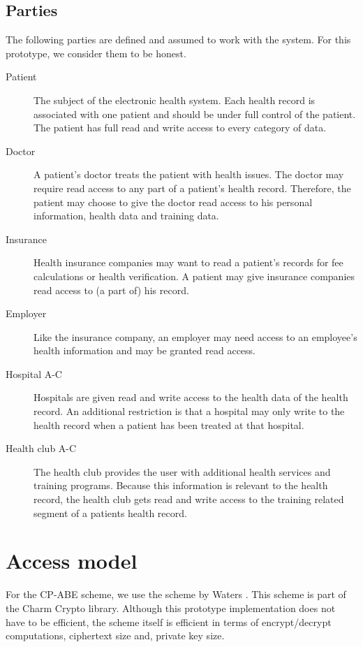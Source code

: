 \documentclass[a4paper]{article}
\begin{document}
	\subsection{Parties}
		The following parties are defined and assumed to work with the system. For this prototype, we consider them to be honest.
		
		\begin{description}
			\item[Patient] The subject of the electronic health system. Each health record is associated with one patient and should be under full control of the patient. The patient has full read and write access to every category of data.
			\item[Doctor] A patient's doctor treats the patient with health issues. The doctor may require read access to any part of a patient's health record. Therefore, the patient may choose to give the doctor read access to his personal information, health data and training data.
			\item[Insurance] Health insurance companies may want to read a patient's records for fee calculations or health verification. A patient may give insurance companies read access to (a part of) his record.
			\item[Employer] Like the insurance company, an employer may need access to an employee's health information and may be granted read access.  
			\item[Hospital A-C] Hospitals are given read and write access to the health data of the health record. An additional restriction is that a hospital may only write to the health record when a patient has been treated at that hospital.
			\item[Health club A-C] The health club provides the user with additional health services and training programs. Because this information is relevant to the health record, the health club gets read and write access to the training related segment of a patients health record.
		\end{description}

\section{Access model}
	For the CP-ABE scheme, we use the scheme by Waters \cite{waters2011ciphertext}. This scheme is part of the Charm Crypto library. Although this prototype implementation does not have to be efficient, the scheme itself is efficient in terms of encrypt/decrypt computations, ciphertext size and, private key size.
	
\end{document}

